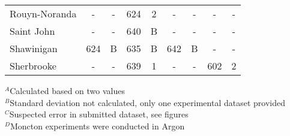 \documentclass{book}
\begin{document}
\begin{table}[ht]
\begin{center}
\begin{tabular}{|l|cc|cc|cc|cc|}
Rouyn-Noranda           & -           & -               & 624            & 2                & -          & -                 & -           & -                     \\
Saint John              & -           & -               & 640            & B                & -          & -                 & -           & -                     \\
Shawinigan              & 624         & B               & 635            & B                & 642        & B                 & -           & -                     \\
Sherbrooke              & -           & -               & 639            & 1                & -          & -                 & 602         & 2                     \\  \hline
\end{tabular}
\end{center}
$^A$Calculated based on two values \\
$^B$Standard deviation not calculated, only one experimental dataset provided \\
$^C$Suspected error in submitted dataset, see figures \\
$^D$Moncton experiments were conducted in Argon
\end{table}
\end{document}
